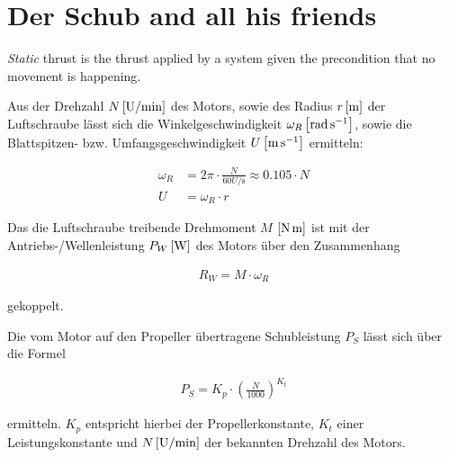 \section{Der Schub and all his friends}


\emph{Static} thrust %
is the thrust applied by a system given the precondition that no movement is happening. 


\bigbreak

Aus der Drehzahl 
$N \withunit{U\per\minute}$ 
des Motors, sowie des Radius 
$r \withunit{\metre}$ 
der Luftschraube lässt sich die Winkelgeschwindigkeit 
$\omega_R \withunit{\radian\per\second}$, 
sowie die Blattspitzen- bzw. Umfangsgeschwindigkeit 
$U \withunit{\metre\per\second}$ 
ermitteln:

\begin{align}
	\omega_R &= 2\pi \cdot \frac{N}{60 \si{U\per\second}} \approx 0.105 \cdot N \\
	U &= \omega_R \cdot r
\end{align}

\bigbreak

Das die Luftschraube treibende Drehmoment $M$ $\withunit{\newton\meter}$ ist mit der Antriebs-/Wellenleistung $P_W \withunit{\watt}$ des Motors über den Zusammenhang

\begin{align}
	R_W = M \cdot \omega_R
\end{align}

gekoppelt.

\bigbreak {}

Die vom Motor auf den Propeller übertragene Schubleistung $P_S$ lässt sich über die Formel

\begin{align}
	P_S = K_p \cdot \left(\frac{N}{1000}\right)^{K_t}
\end{align}

ermitteln. $K_p$ entspricht hierbei der Propellerkonstante, $K_t$ einer Leistungskonstante  und $N \withunit{U\per\minute}$ der bekannten Drehzahl des Motors.

